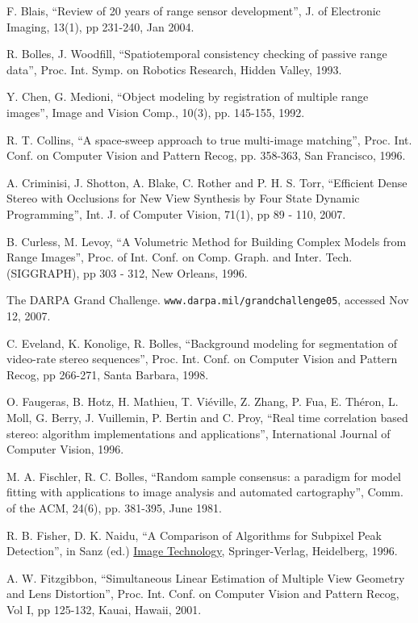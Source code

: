 \documentclass[twocolumn,oneside]{book}
\begin{document}
\begin{thebibliography}{99}
F. Blais,
``Review of 20 years of range sensor development'',
J. of Electronic Imaging, 13(1), pp 231-240, Jan 2004.

R. Bolles, J. Woodfill, 
``Spatiotemporal consistency checking of passive range data'',  
Proc. Int. Symp. on Robotics Research, Hidden Valley, 1993.

Y. Chen, G. Medioni,
``Object modeling by registration of multiple range images'',
Image and Vision Comp., 10(3), pp. 145-155, 1992.

R. T. Collins,
``A space-sweep approach to true multi-image matching'', 
Proc. Int. Conf. on Computer Vision and Pattern Recog, pp. 358-363, San Francisco, 1996.

A.  Criminisi, J. Shotton, A. Blake, C. Rother and P. H. S. Torr,
``Efficient Dense Stereo with Occlusions for New View Synthesis by Four State Dynamic Programming'', 
Int. J. of Computer Vision, 71(1), pp 89 - 110, 2007.

B. Curless, M. Levoy,
``A Volumetric Method for Building Complex Models from Range Images'',
Proc.  of Int. Conf. on Comp. Graph. and Inter. Tech. (SIGGRAPH), pp 303 - 312, New Orleans, 1996.

The DARPA Grand Challenge.
\verb+www.darpa.mil/grandchallenge05+, accessed Nov 12, 2007.


C. Eveland, K. Konolige, R. Bolles,
``Background modeling for segmentation of video-rate stereo sequences'',
Proc. Int. Conf. on Computer Vision and Pattern Recog, pp 266-271, Santa Barbara, 1998.

O. Faugeras, B. Hotz, H. Mathieu, T. Vi\'eville, Z. Zhang, P. Fua,
E. Th\'eron, L. Moll, G. Berry, J. Vuillemin, P. Bertin and C. Proy,
``Real time correlation based stereo: algorithm implementations and applications'',
International Journal of Computer Vision, 1996.


M. A. Fischler, R. C. Bolles,
``Random sample consensus: a paradigm for model fitting with applications to
image analysis and automated cartography'',
Comm. of the ACM, 24(6), pp. 381-395, June 1981. 

R. B. Fisher, D. K. Naidu,  
``A Comparison of Algorithms for Subpixel Peak Detection'',
in Sanz (ed.) {\underline {Image Technology}},
Springer-Verlag, Heidelberg, 1996.

A. W. Fitzgibbon,
``Simultaneous Linear Estimation of Multiple View Geometry and Lens Distortion'',
Proc. Int. Conf. on Computer Vision and Pattern Recog, Vol I, pp 125-132, Kauai, Hawaii, 2001.


\end{thebibliography}
\end{document}
